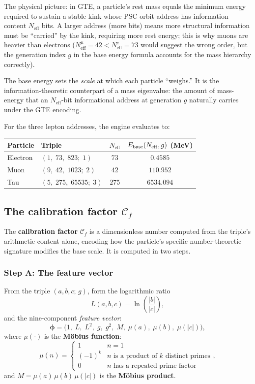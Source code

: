 \documentclass[11pt,a4paper]{article}
\newcommand{\term}[1]{\textbf{#1}}
\newcommand{\Neff}{N_{\mathrm{eff}}}
\begin{document}
The physical picture: in GTE, a particle's rest mass equals the minimum energy
required to sustain a stable kink whose PSC orbit address has information content
$\Neff$ bits.  A larger address (more bits) means more structural information must
be ``carried'' by the kink, requiring more rest energy; this is why muons are heavier
than electrons ($\Neff^{\mu} = 42 < \Neff^{e} = 73$ would suggest the wrong order,
but the generation index $g$ in the base energy formula accounts for the mass hierarchy correctly).

The base energy sets the \emph{scale} at which each particle ``weighs.''  It
is the information-theoretic counterpart of a mass eigenvalue: the amount of
mass-energy that an $\Neff$-bit informational address at generation $g$ naturally
carries under the GTE encoding.

For the three lepton addresses, the engine evaluates to:

\begin{center}
\renewcommand{\arraystretch}{1.35}
\begin{tabular}{@{}llcc@{}}
\toprule
Particle & Triple & $\Neff$ & $E_{\rm base}(\Neff, g)$ (MeV) \\
\midrule
Electron & $(1,\;73,\;823;\;1)$    & $73$  & $0.4585$ \\
Muon     & $(9,\;42,\;1023;\;2)$   & $42$  & $110.952$ \\
Tau      & $(5,\;275,\;65535;\;3)$ & $275$ & $6534.094$ \\
\bottomrule
\end{tabular}
\end{center}

\subsection{The calibration factor $\mathcal{C}_f$}

The \term{calibration factor} $\mathcal{C}_f$ is a dimensionless number computed
from the triple's arithmetic content alone, encoding how the particle's specific
number-theoretic signature modifies the base scale.  It is computed in two steps.

\subsubsection*{Step A: The feature vector}

From the triple $(a, b, c;\, g)$, form the logarithmic ratio
\[
  L(a,b,c) = \ln\!\left(\frac{|b|}{|c|}\right),
\]
and the nine-component \emph{feature vector}:
\[
  \boldsymbol{\phi} = \bigl(1,\; L,\; L^2,\; g,\; g^2,\; M,\; \mu(a),\; \mu(b),\; \mu(|c|)\bigr),
\]
where $\mu(\cdot)$ is the \term{M\"{o}bius function}:
\[
  \mu(n) = \begin{cases}
    1  & n = 1 \\
    (-1)^k & n \text{ is a product of } k \text{ distinct primes} \\
    0  & n \text{ has a repeated prime factor}
  \end{cases},
\]
and $M = \mu(a)\,\mu(b)\,\mu(|c|)$ is the \term{M\"{o}bius product}.
\end{document}
